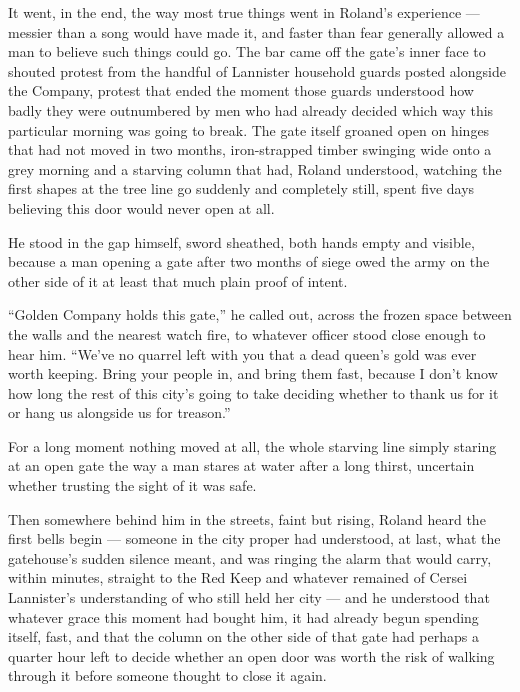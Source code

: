 It went, in the end, the way most true things went in Roland’s experience — messier than a song would have made it, and faster than fear generally allowed a man to believe such things could go. The bar came off the gate’s inner face to shouted protest from the handful of Lannister household guards posted alongside the Company, protest that ended the moment those guards understood how badly they were outnumbered by men who had already decided which way this particular morning was going to break. The gate itself groaned open on hinges that had not moved in two months, iron-strapped timber swinging wide onto a grey morning and a starving column that had, Roland understood, watching the first shapes at the tree line go suddenly and completely still, spent five days believing this door would never open at all.

He stood in the gap himself, sword sheathed, both hands empty and visible, because a man opening a gate after two months of siege owed the army on the other side of it at least that much plain proof of intent.

“Golden Company holds this gate,” he called out, across the frozen space between the walls and the nearest watch fire, to whatever officer stood close enough to hear him. “We’ve no quarrel left with you that a dead queen’s gold was ever worth keeping. Bring your people in, and bring them fast, because I don’t know how long the rest of this city’s going to take deciding whether to thank us for it or hang us alongside us for treason.”

For a long moment nothing moved at all, the whole starving line simply staring at an open gate the way a man stares at water after a long thirst, uncertain whether trusting the sight of it was safe.

Then somewhere behind him in the streets, faint but rising, Roland heard the first bells begin — someone in the city proper had understood, at last, what the gatehouse’s sudden silence meant, and was ringing the alarm that would carry, within minutes, straight to the Red Keep and whatever remained of Cersei Lannister’s understanding of who still held her city — and he understood that whatever grace this moment had bought him, it had already begun spending itself, fast, and that the column on the other side of that gate had perhaps a quarter hour left to decide whether an open door was worth the risk of walking through it before someone thought to close it again.